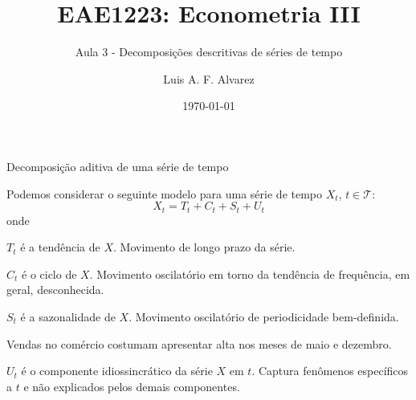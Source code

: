 \documentclass[11pt]{beamer}
\author{Luis A. F. Alvarez}
\title{EAE1223: Econometria III}
\subtitle{Aula 3 - Decomposições descritivas de séries de tempo}
\date{\today}
\newenvironment{halfwideitemize}{\itemize\addtolength{\itemsep}{0.5em}}{\enditemize}
\newenvironment{halfwideenumerate}{\enumerate\addtolength{\itemsep}{0.5em}}{\endenumerate}
\begin{document}
\begin{frame}[plain]
	\maketitle
\end{frame}

\begin{frame}{Decomposição aditiva de uma série de tempo}
	\begin{halfwideitemize}
		\item Podemos considerar o seguinte modelo para uma série de tempo $X_t$, $t \in \mathcal{T}$:
		\begin{equation}
			X_t = 	T_t + C_t + S_t + U_t
		\end{equation}
		onde
		\begin{halfwideenumerate}
			\item $T_t$ é a {\color{blue}tendência} de $X$. Movimento de longo prazo da série.
			\item $C_t$ é o {\color{blue}ciclo} de $X$. Movimento oscilatório em torno da tendência de frequência, em geral, desconhecida.
			\item $S_t$ é a {\color{blue}sazonalidade} de $X$. Movimento oscilatório de periodicidade bem-definida.
			\begin{halfwideitemize}
				\item Vendas no comércio costumam apresentar alta nos meses de maio e dezembro.
			\end{halfwideitemize}
			\item $U_t$ é o {\color{blue}componente idiossincrático} da série $X$ em $t$. Captura fenômenos específicos a $t$ e não explicados pelos demais componentes.
		\end{halfwideenumerate}
	\end{halfwideitemize}
\end{frame}
\end{document}
